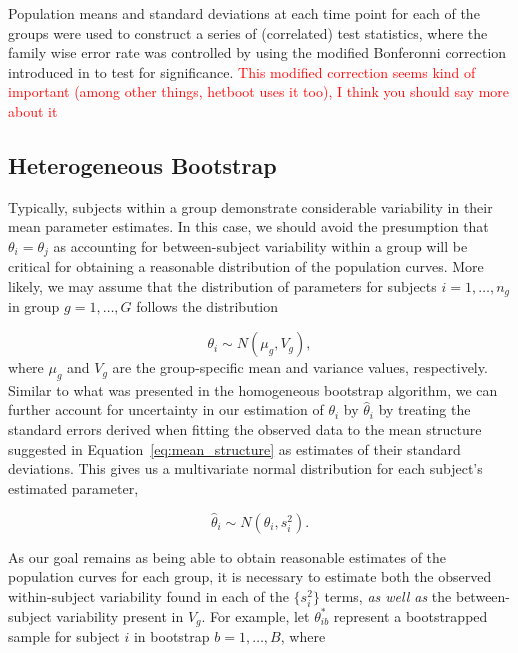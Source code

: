\documentclass{article}
\providecommand{\pb}[1]{\textcolor{red}{#1}}
\begin{document}
Population means and standard deviations at each time point for each of the groups were used to construct a series of (correlated) test statistics, where the family wise error rate was controlled by using the modified Bonferonni correction introduced in \cite{oleson2017detecting} to test for significance. \pb{This modified correction seems kind of important (among other things, hetboot uses it too), I think you should say more about it}

\subsection{Heterogeneous Bootstrap}

Typically, subjects within a group demonstrate considerable variability in their mean parameter estimates. In this case, we should avoid the presumption that $\theta_i = \theta_j$ as accounting for between-subject variability within a group will be critical for obtaining a reasonable distribution of the population curves. More likely, we may assume that the distribution of parameters for subjects $i = 1, \dots, n_g$ in group $g = 1, \dots, G$ follows the distribution

\begin{equation}\label{eq:theta_i_dist}
\theta_i \sim N(\mu_{g}, V_{g}),
\end{equation}
where $\mu_g$ and $V_g$ are the group-specific mean and variance values, respectively. Similar to what was presented in the homogeneous bootstrap algorithm, we can further account for uncertainty in our estimation of $\theta_i$ by $\hat{\theta}_i$ by treating the standard errors derived when fitting the observed data to the mean structure suggested in Equation~\ref{eq:mean_structure} as estimates of their standard deviations. This gives us a multivariate normal distribution for each subject's estimated parameter, 

\begin{equation}
\hat{\theta}_i \sim N(\theta_i, s_i^2).
\end{equation}

As our goal remains as being able to obtain reasonable estimates of the population curves for each group, it is necessary to estimate both the observed within-subject variability found in each of the $\{s_i^2\}$ terms, \textit{as well as} the between-subject variability present in $V_{g}$. For example, let $\theta^*_{ib}$ represent a bootstrapped sample for subject $i$ in bootstrap $b = 1, \dots, B$, where
\end{document}
